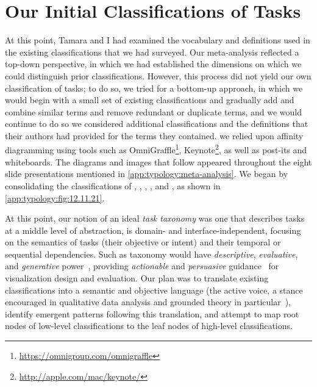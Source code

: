 
\section{Our Initial Classifications of Tasks}
\label{app:typology:chronology:initial}


At this point, Tamara and I had examined the vocabulary and definitions used in the existing classifications that we had surveyed.
Our meta-analysis reflected a top-down perspective, in which we had established the dimensions on which we could distinguish prior classifications.
However, this process did not yield our own classification of tasks; to do so, we tried for a bottom-up approach, in which we would begin with a small set of existing classifications and gradually add and combine similar terms and remove redundant or duplicate terms, and we would continue to do so we considered additional classifications and the definitions that their authors had provided for the terms they contained.
we relied upon affinity diagramming using tools such as OmniGraffle\footnote{\url{https://omnigroup.com/omnigraffle}}, Keynote\footnote{\url{http://apple.com/mac/keynote/}}, as well as post-its and whiteboards.
The diagrams and images that follow appeared throughout the eight slide presentations mentioned in \autoref{app:typology:meta-analysis}.
We began by consolidating the classifications of \citet{Heer2012}, \citet{Springmeyer1992}, \citet{Amar2005}, \citet{Gotz2008}, and \citet{Chuah1996}, as shown in \autoref{app:typology:fig:12.11.21}.

At this point, our notion of an ideal {\it task taxonomy} was one that describes tasks at a middle level of abstraction, is domain- and interface-independent, focusing on the semantics of tasks (their objective or intent) and their temporal or sequential dependencies.
Such as taxonomy would have {\it descriptive}, {\it evaluative}, and {\it generative} power~\cite{Beaudouin-Lafon2004}, providing {\it actionable} and {\it persuasive} guidance~\cite{Gleicher2012} for visualization design and evaluation.
Our plan was to translate existing classifications into a semantic and objective language (\ie the active voice, a stance encouraged in qualitative data analysis and grounded theory in particular~\cite{Charmaz2006}), identify emergent patterns following this translation, and attempt to map root nodes of low-level classifications to the leaf nodes of high-level classifications.

